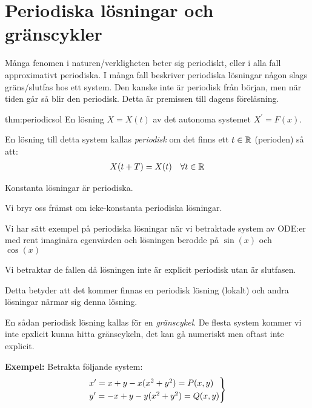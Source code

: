 \section{Periodiska lösningar och gränscykler}
\par\bigskip
\noindent Många fenomen i naturen/verkligheten beter sig periodiskt, eller i alla fall approximativt periodiska. I många fall beskriver periodiska lösningar någon slags gräns/slutfas hos ett system. Den kanske inte är periodisk från början, men när tiden går så blir den periodisk. Detta är premissen till dagens föreläsning.
\par\bigskip

\begin{theo}{thm:periodicsol}
  En lösning $X=X(t)$ av det autonoma systemet $X^{\prime} = F(x)$.\par
  \noindent En lösning till detta system kallas \textit{periodisk} om det finns ett $t\in\mathbb{R}$ (perioden) så att:
  \begin{equation*}
    \begin{gathered}
      X(t+T)=X(t) \quad \forall t\in\mathbb{R}
    \end{gathered}
  \end{equation*}\par
  \noindent Konstanta lösningar är periodiska.
\end{theo}
\par\bigskip
\noindent Vi bryr oss främst om icke-konstanta periodiska lösningar.
\par\bigskip
\noindent Vi har sätt exempel på periodiska lösningar när vi betraktade system av ODE:er med rent imaginära egenvärden och lösningen berodde på $\sin(x)$ och $\cos(x)$
\par\bigskip
\noindent Vi betraktar de fallen då lösningen inte är explicit periodisk utan är slutfasen.\par
\noindent Detta betyder att det kommer finnas en periodisk lösning (lokalt) och andra lösningar närmar sig denna lösning.
\par\bigskip
\noindent En sådan periodisk lösning kallas för en \textit{gränscykel}. De flesta system kommer vi inte epxlicit kunna hitta gränscykeln, det kan gå numeriskt men oftast inte explicit.
\par\bigskip
\noindent\textbf{Exempel:} Betrakta följande system:
\begin{equation*}
  \begin{gathered}
    \begin{rcases*}
      x^{\prime} = x+y-x(x^2+y^2) = P(x,y)\\
      y^{\prime} = -x+y-y(x^2+y^2) = Q(x,y)
    \end{rcases*}
  \end{gathered}
\end{equation*}
